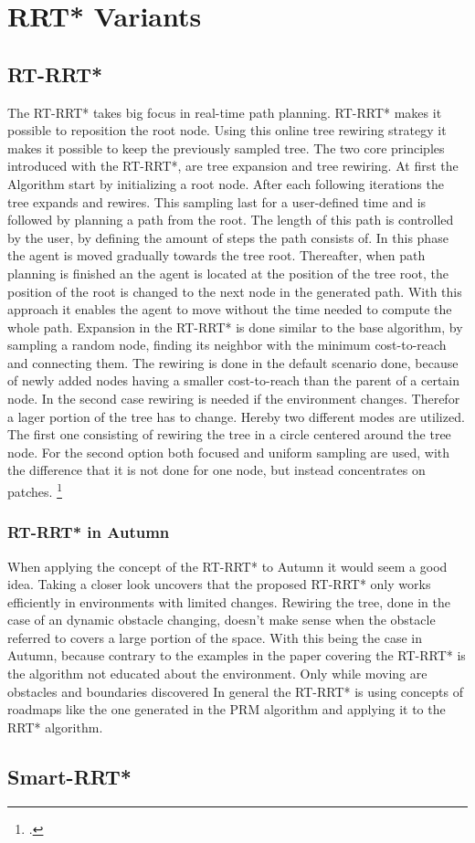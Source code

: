 \section{RRT* Variants}

\subsection{RT-RRT*}

The RT-RRT* takes big focus in real-time path planning. RT-RRT* makes it possible to reposition the root node. Using this online tree rewiring strategy it makes it possible to keep the previously sampled tree.
The two core principles introduced with the RT-RRT*, are tree expansion and tree rewiring. 
At first the Algorithm start by initializing a root node. After each following iterations the tree expands and rewires. This sampling last for a user-defined time and is followed by planning a path from the root. The length of this path is controlled by the user, by defining the amount of steps the path consists of. In this phase the agent is moved gradually towards the tree root. Thereafter, when path planning is finished an the agent is located at the position of the tree root, the position of the root is changed to the next node in the generated path. With this approach it enables the agent to move without the time needed to compute the whole path.
Expansion in the RT-RRT* is done similar to the base algorithm, by sampling a random node, finding its neighbor with the minimum cost-to-reach and connecting them.
The rewiring is done in the default scenario done, because of newly added nodes having a smaller cost-to-reach than the parent of a certain node. In the second case rewiring is needed if the environment changes. Therefor a lager portion of the tree has to change. Hereby two different modes are utilized. The first one consisting of rewiring the tree in a circle centered around the tree node. For the second option both focused and uniform sampling are used, with the difference that it is not done for one node, but instead concentrates on patches.
\footcite{Naderi2015}

\subsubsection{RT-RRT* in Autumn}

When applying the concept of the RT-RRT* to Autumn it would seem a good idea. Taking a closer look uncovers that the proposed RT-RRT* only works efficiently in environments with limited changes. Rewiring the tree, done in the case of an dynamic obstacle changing, doesn't make sense when the obstacle referred to covers a large portion of the space. With this being the case in Autumn, because contrary to the examples in the paper covering the RT-RRT* is the algorithm not educated about the environment. Only while moving are obstacles and boundaries discovered In general the RT-RRT* is using concepts of roadmaps like the one generated in the PRM algorithm and applying it to the RRT* algorithm.  

\subsection{Smart-RRT*}
